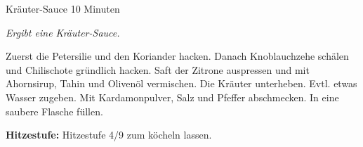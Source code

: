 \begin{recipe}{Kräuter-Sauce} {} {10 Minuten}

  \freeform
  \textit{Ergibt eine Kräuter-Sauce.}


  Zuerst die Petersilie und den Koriander hacken.
  Danach Knoblauchzehe schälen und Chilischote gründlich hacken.
  Saft der Zitrone auspressen und mit Ahornsirup, Tahin und Olivenöl vermischen.
  Die Kräuter unterheben.
  Evtl. etwas Wasser zugeben.
  Mit Kardamonpulver, Salz und Pfeffer abschmecken.
  In eine saubere Flasche füllen.

  \freeform
  \hrulefill

  \freeform
  \textbf{Hitzestufe:}
  Hitzestufe 4/9 zum köcheln lassen.

  \end{recipe}
